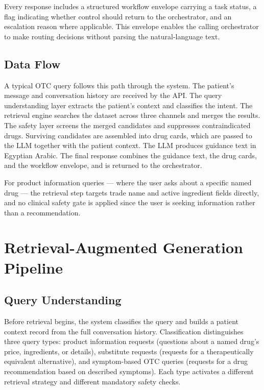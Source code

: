 \documentclass[12pt,a4paper]{article}
\begin{document}
\begin{description}[leftmargin=0em, style=nextline]
    \item[\textbf{Workflow Envelope}]
        Every response includes a structured workflow envelope carrying
        a task status, a flag indicating whether control should return
        to the orchestrator, and an escalation reason where applicable.
        This envelope enables the calling orchestrator to make routing
        decisions without parsing the natural-language text.

\end{description}

\subsection{Data Flow}

A typical OTC query follows this path through the system. The patient's
message and conversation history are received by the API. The query
understanding layer extracts the patient's context and classifies the
intent. The retrieval engine searches the dataset across three channels
and merges the results. The safety layer screens the merged candidates
and suppresses contraindicated drugs. Surviving candidates are assembled
into drug cards, which are passed to the LLM together with the patient
context. The LLM produces guidance text in Egyptian Arabic. The final
response combines the guidance text, the drug cards, and the workflow
envelope, and is returned to the orchestrator.

For product information queries --- where the user asks about a specific
named drug --- the retrieval step targets trade name and active ingredient
fields directly, and no clinical safety gate is applied since the user is
seeking information rather than a recommendation.

\section{Retrieval-Augmented Generation Pipeline}
\label{sec:rag}

\subsection{Query Understanding}

Before retrieval begins, the system classifies the query and builds a
patient context record from the full conversation history. Classification
distinguishes three query types: product information requests (questions
about a named drug's price, ingredients, or details), substitute requests
(requests for a therapeutically equivalent alternative), and symptom-based
OTC queries (requests for a drug recommendation based on described symptoms).
Each type activates a different retrieval strategy and different mandatory
safety checks.
\end{document}
